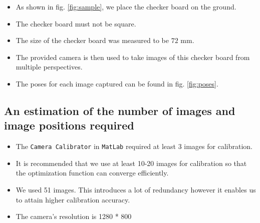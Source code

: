 \begin{itemize}
\item As shown in fig. \ref{fig:sample}, we place the checker board on the ground.
\item The checker board must not be square.
\item The size of the checker board was measured to be $72$ mm.
\item The provided camera is then used to take images of this checker board from multiple perspectives.
\item The poses for each image captured can be found in fig. \ref{fig:poses}.
\end{itemize}

\subsection{An estimation of the number of images and image positions required}
\begin{itemize}
\item The \texttt{Camera Calibrator} in \texttt{MatLab} required at least 3 images for calibration.
\item It is recommended that we use at least 10-20 images for calibration so that the optimization function can converge efficiently.
\item We used 51 images. This introduces a lot of redundancy however it enables us to attain higher calibration accuracy.
\item The camera's resolution is 1280 * 800
\end{itemize}

